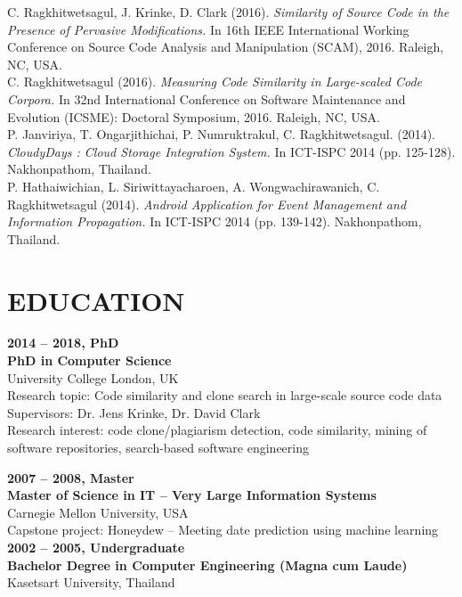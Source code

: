 \documentclass[margin, 10pt]{res} %
\begin{document}
\begin{resume}
C. Ragkhitwetsagul, J. Krinke, D. Clark (2016). \textit{Similarity of Source Code in the Presence of Pervasive Modifications.} In 16th IEEE International Working Conference on Source Code Analysis and Manipulation (SCAM), 2016. Raleigh, NC, USA. \vspace{2mm} \\
C. Ragkhitwetsagul (2016). \textit{Measuring Code Similarity in Large-scaled Code Corpora.} In 32nd International Conference on Software Maintenance and Evolution (ICSME): Doctoral Symposium, 2016. Raleigh, NC, USA. \vspace{2mm} \\
\newpage
P. Janviriya, T. Ongarjithichai, P. Numruktrakul, C. Ragkhitwetsagul. (2014). \textit{CloudyDays : Cloud Storage Integration System.} In ICT-ISPC 2014 (pp. 125-128). Nakhonpathom, Thailand. \vspace{2mm} \\
P. Hathaiwichian, L. Siriwittayacharoen, A. Wongwachirawanich, C. Ragkhitwetsagul (2014). \textit{Android Application for Event Management and Information Propagation.} In ICT-ISPC 2014 (pp. 139-142). Nakhonpathom, Thailand.


\section{EDUCATION}
\textbf{2014 -- 2018, PhD}\\
\textbf{PhD in Computer Science}\\
University College London, UK\\
Research topic:  Code similarity and clone search in large-scale source code data \\
Supervisors: Dr. Jens Krinke, Dr. David Clark\\
Research interest: code clone/plagiarism detection, code similarity, mining of software repositories, search-based software engineering 

\textbf{2007 -- 2008, Master} \\
\textbf{Master of Science in IT -- Very Large Information Systems}\\
Carnegie Mellon University, USA\\
Capstone project: Honeydew -- Meeting date prediction using machine learning \vspace{3mm} \\
\textbf{2002 -- 2005, Undergraduate }\\
\textbf{Bachelor Degree in Computer Engineering (Magna cum Laude)}\\
Kasetsart University, Thailand


\end{resume}
\end{document}
